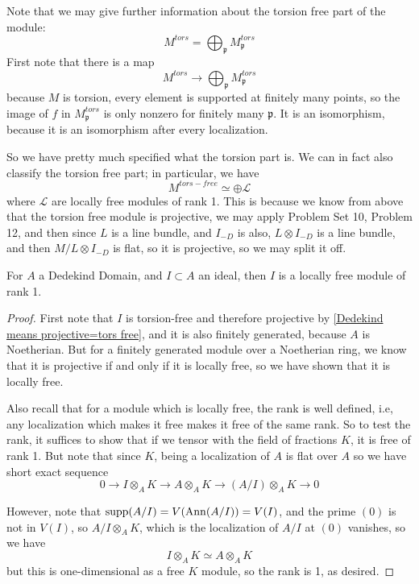 Note that we may give further information about the torsion free part of the module:
\[M^{tors}=\bigoplus_{\mathfrak{p}} M_{\mathfrak{p}}^{tors}\]
First note that there is a map
\[M^{tors} \to \bigoplus_{\mathfrak{p}} M_{\mathfrak{p}}^{tors}\]
because $M$ is torsion, every element is supported at finitely many points, so the image of $f$ in $M^{tors}_\mathfrak{p}$ is only nonzero for finitely many $\mathfrak{p}$.
It is an isomorphism, because it is an isomorphism after every localization.

So we have pretty much specified what the torsion part is. We can in fact also classify the torsion free part;  in particular, we have
\[M^{tors-free} \simeq \oplus \mathcal{L}\]
where $\mathcal{L}$ are locally free modules of rank 1.
This is because we know from above that the torsion free module is projective, we may apply Problem Set 10, Problem 12, and then since $L$ is a line bundle, and $I_{-D}$ is also, $L \otimes I_{-D}$ is a line bundle, and then $M/L \otimes I_{-D}$ is flat, so it is projective, so we may split it off.



\begin{lemma} For $A$ a Dedekind Domain, and $I \subset A$ an ideal, then $I$ is a locally free module of rank 1.
\end{lemma}
\begin{proof}
First note that $I$ is torsion-free and therefore projective by \ref{Dedekind means projective=tors free}, and it is also finitely generated, because $A$ is Noetherian. But for a finitely generated module over a Noetherian ring, we know that it is projective if and only if it is locally free, so we have shown that it is locally free.

Also recall that for a module which is locally free, the rank is well defined,
i.e, any localization which makes it free makes it free of the same rank. So
to test the rank, it suffices to show that if we tensor with the field of
fractions $K$, it is free of rank 1. But note that since $K$, being a localization of $A$ is flat over $A$ so we have short exact sequence
\[0 \to I \otimes_A K \to A \otimes_A K \to (A/I) \otimes_A K \to 0\]

However, note that $\operatorname{supp}(A/I)=V(\operatorname{Ann}(A/I))=V(I)$, and the prime $(0)$ is not
in $V(I)$, so $A/I \otimes_{A} K$, which is the localization of $A/I$ at $(0)$ vanishes, so we have
\[I\otimes_A K \simeq A\otimes_A K\]
but this is one-dimensional as a free $K$ module, so the rank is 1, as desired.
\end{proof}


